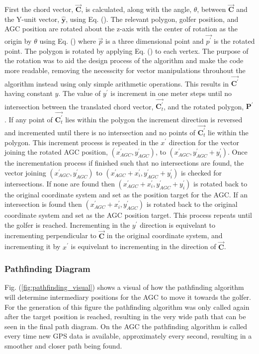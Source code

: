 \documentclass[11pt,landscape]{article}
\begin{document}
\begin{multicols}{3}
First the chord vector, $\overrightarrow{\mathbf{C}}$, is calculated, along with
the angle, $\theta$, between $\overrightarrow{\mathbf{C}}$ and the Y-unit vector,
$\hat{\mathbf{y}}$, using Eq. ().  The relevant polygon, golfer position, and AGC
position are rotated about the z-axis with the center of rotation as the
origin by $\theta$ using Eq. () where $\overrightarrow{p}$ is a
three dimensional point and $\overrightarrow{p^\prime}$ is the rotated point. 
The polygon is rotated by applying Eq. () to each
vertex. The purpose of the rotation was to aid the design process of the
algorithm and make the code more readable, removing the necesscity for vector
manipulations throuhout the algorithm instead using only simple arithmetic operations.
This results in $\overrightarrow{\mathbf{C}^\prime}$ having constant $y$. The
value of $y^\prime$ is increment in one meter steps until no intersection
between the translated chord vector, $\overrightarrow{\mathbf{C}^\prime_t}$, and
the rotated polygon, $\mathbf{P}^\prime$. If any point of
$\overrightarrow{\mathbf{C}^\prime_t}$ lies within the polygon the increment
direction is reversed and incremented until there is no intersection and no
points of $\overrightarrow{\mathbf{C}^\prime_t}$ lie within the polygon. This
increment process is repeated in the $x^\prime$ direction for the vector joining
the rotated AGC position,
$\left(x^\prime_{AGC}, y^\prime_{AGC}\right)$, to $\left(x^\prime_{AGC},
y^\prime_{AGC} + y^\prime_i\right)$. Once the incrementation process if finished
such that no intersections are found, the vector joining $\left(x^\prime_{AGC},
y^\prime_{AGC}\right)$ to $\left(x^\prime_{AGC}+x^\prime_i,
y^\prime_{AGC} + y^\prime_i\right)$ is checked for intersections. If none are
found then $\left(x^\prime_{AGC}+x^\prime_i,
y^\prime_{AGC} + y^\prime_i\right)$ is rotated back to the original coordinate
system and set as the position target for the AGC. If an intersection is found
then $\left(x^\prime_{AGC}+x^\prime_i, y^\prime_{AGC}\right)$ is rotated back to
the original coordinate system and set as the AGC position target. This process
repeats until the golfer is reached. Incrementing in the $y^\prime$ direction
is equivelant to incrementing perpendicular to
$\overrightarrow{\mathbf{C}}$ in
the original coordinate system, and incrementing it by $x^\prime$ is equivelant
to incrementing in the direction of $\overrightarrow{\mathbf{C}}$.
\subsubsection{Pathfinding Diagram}
Fig. (\ref{fig:pathfinding_visual}) shows a visual of how the pathfinding algorithm will determine intermediary
positions for the AGC to move it towards the golfer. For the generation of this
figure the pathfinding algorithm was only called again after the target position
is reached, resulting in the very wide path that can be seen in the final path
diagram. On the AGC the pathfinding algorithm is called every time new GPS data
is available, approximately every second, resulting in a smoother and closer
path being found.
\end{multicols}
\end{document}
